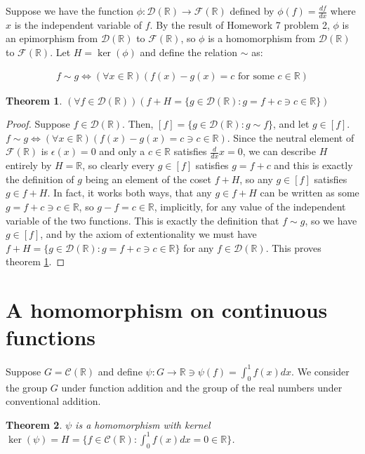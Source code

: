 \documentclass[12pt]{article}
\newcommand{\reals}{\mathbb{R}}
\newcommand{\freals}{\mathcal{F}(\reals)}
\newcommand{\dreals}{\mathcal{D}(\reals)}
\newcommand{\creals}{\mathcal{C}(\reals)}
\newtheorem{thm}{Theorem}
\begin{document}
Suppose we have
the function $\phi: \dreals \to \freals$
defined by $\phi(f) = \frac{df}{dx}$
where $x$ is the independent variable of $f$.
By the result of Homework 7 problem 2,
$\phi$ is an epimorphism from $\dreals$ to $\freals$,
so $\phi$ is a homomorphism from $\dreals$ to $\freals$.
Let $H = \ker(\phi)$ and define the relation $\sim$ as:

\begin{align} \label{sim}
	f \sim g \iff (\forall x \in \reals)(f(x) - g(x) = c \text{ for some } c \in \reals)
\end{align}

\begin{thm} \label{thm8}
	$(\forall f \in \dreals)(f + H = \{g \in \dreals: g = f + c \ni c \in \reals\})$
\end{thm}

\begin{proof}
	Suppose $f \in \dreals$.
	Then, $[f] = \{g \in \dreals: g \sim f \}$, and let $g \in [f]$.
	$f \sim g \iff (\forall x \in \reals)(f(x) - g(x) = c \ni c \in \reals)$.
	Since the neutral element of $\freals$ is $\epsilon(x) = 0$ and
	only a $c \in \reals$ satisfies $\frac{d}{dx} x = 0$,
	we can describe $H$ entirely by $H = \reals$,
	so clearly every $g \in [f]$ satisfies $g = f + c$
	and this is exactly the definition of $g$ being
	an element of the coset $f + H$,
	so any $g \in [f]$ satisfies $g \in f + H$.
	In fact, it works both ways, that any
	$g \in f + H$ can be written as some $g = f + c \ni c \in \reals$,
	so $g - f = c \in \reals$, implicitly, for any value of
	the independent variable of the two functions.
	This is exactly the definition that $f \sim g$,
	so we have $g \in [f]$,
	and by the axiom of extentionality
	we must have $f + H = \{g \in \dreals: g = f + c \ni c \in \reals\}$
	for any $f \in \dreals$. This proves theorem \ref{thm8}.
\end{proof}

\section{A homomorphism on continuous functions}

Suppose $G = \creals$ and define $\psi: G \to \reals \ni \psi(f) = \int_0^1 f(x)dx$.
We consider the group $G$ under function addition
and the group of the real numbers under conventional addition.

\begin{thm} \label{thm9}
	$\psi$ is a homomorphism with kernel $\ker(\psi) = H = \{f \in \creals: \int_0^1 f(x)dx = 0 \in \reals\}$.
\end{thm}
\end{document}
